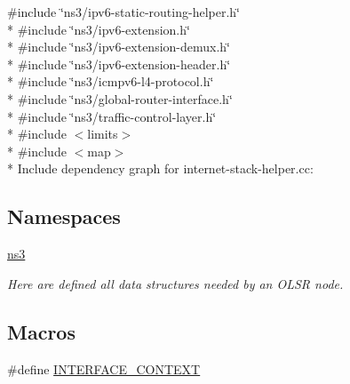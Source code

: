 {\ttfamily \#include \char`\"{}ns3/ipv6-\/static-\/routing-\/helper.\+h\char`\"{}}\\*
{\ttfamily \#include \char`\"{}ns3/ipv6-\/extension.\+h\char`\"{}}\\*
{\ttfamily \#include \char`\"{}ns3/ipv6-\/extension-\/demux.\+h\char`\"{}}\\*
{\ttfamily \#include \char`\"{}ns3/ipv6-\/extension-\/header.\+h\char`\"{}}\\*
{\ttfamily \#include \char`\"{}ns3/icmpv6-\/l4-\/protocol.\+h\char`\"{}}\\*
{\ttfamily \#include \char`\"{}ns3/global-\/router-\/interface.\+h\char`\"{}}\\*
{\ttfamily \#include \char`\"{}ns3/traffic-\/control-\/layer.\+h\char`\"{}}\\*
{\ttfamily \#include $<$limits$>$}\\*
{\ttfamily \#include $<$map$>$}\\*
Include dependency graph for internet-\/stack-\/helper.cc\+:
\subsection*{Namespaces}
\begin{DoxyCompactItemize}
\item 
 \hyperlink{namespacens3}{ns3}
\begin{DoxyCompactList}\small\item\em Here are defined all data structures needed by an O\+L\+SR node. \end{DoxyCompactList}\end{DoxyCompactItemize}
\subsection*{Macros}
\begin{DoxyCompactItemize}
\item 
\#define \hyperlink{internet-stack-helper_8cc_a7db88cb02fe5c738db27431496b7131e}{I\+N\+T\+E\+R\+F\+A\+C\+E\+\_\+\+C\+O\+N\+T\+E\+XT}
\end{DoxyCompactItemize}
